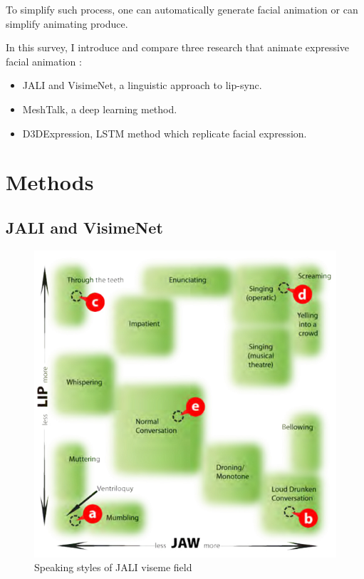 \documentclass[10pt,twocolumn,letterpaper]{article}
\begin{document}
To simplify such process, one can automatically generate facial animation or can simplify animating produce.

In this survey, I introduce and compare three research that animate expressive facial animation :
\begin{itemize}
 \item JALI\cite{edwardsJALIAnimatorcentricViseme2016} and VisimeNet\cite{zhouVisemenetAudiodrivenAnimatorcentric2018}, a linguistic approach to lip-sync.
 \item MeshTalk\cite{richardMeshTalk3DFace2021}, a deep learning method.
 \item D3DExpression\cite{potamiasLearningGenerateCustomized2020}, LSTM method which replicate facial expression.
\end{itemize}






\section{Methods}

\subsection{JALI and VisimeNet}

\begin{figure}
   \includegraphics[width=1.0\linewidth]{jaliStyles}
   
   \caption{Speaking styles of JALI viseme field}
   \label{fig:jaliStyles}
\end{figure}
\end{document}
